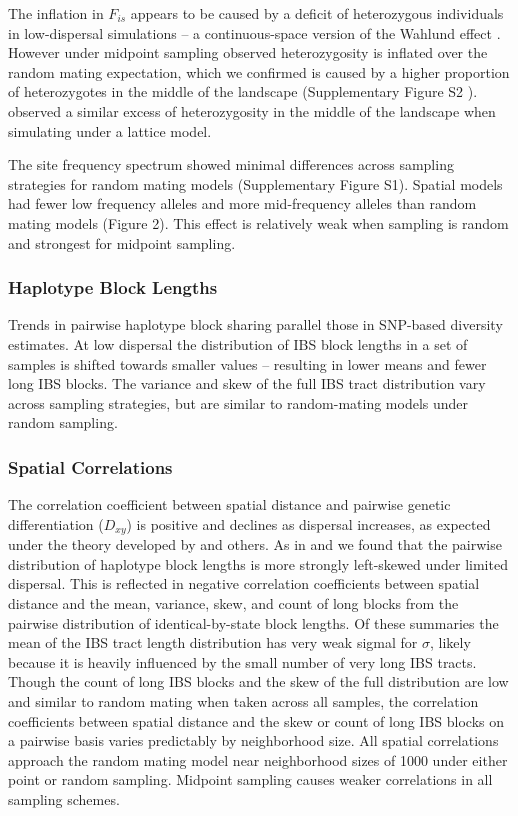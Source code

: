 \documentclass[9pt,twocolumn,twoside,lineno]{gsajnl}
\newif\ifcomments
\newcommand{\cjb}[1]{\ifcomments{{\color{blue} \it (#1)}}\else{}\fi}
\begin{document}
The inflation in $F_{is}$ appears to be caused by a deficit of heterozygous individuals in low-dispersal simulations -- a continuous-space version of the Wahlund effect \citep{Wahlund1928}. However under midpoint sampling observed heterozygosity is inflated over the random mating expectation, which we confirmed is caused by a higher proportion of heterozygotes in the middle of the landscape (Supplementary Figure S2 \cjb{CJ - this fig isn't super convincing -- will try denser sampling}). \cite{Shirk2014} observed a similar excess of heterozygosity in the middle of the landscape when simulating under a lattice model. 

The site frequency spectrum showed minimal differences across sampling strategies for random mating models (Supplementary Figure S1). Spatial models had fewer low frequency alleles and more mid-frequency alleles than random mating models (Figure 2). This effect is relatively weak when sampling is random and strongest for midpoint sampling. 

\subsubsection{Haplotype Block Lengths}
Trends in pairwise haplotype block sharing parallel those in SNP-based diversity estimates. At low dispersal the distribution of IBS block lengths in a set of samples is shifted towards smaller values -- resulting in lower means and fewer long IBS blocks. The variance and skew of the full IBS tract distribution vary across sampling strategies, but are similar to random-mating models under random sampling. 

\subsubsection{Spatial Correlations}
The correlation coefficient between spatial distance and pairwise genetic differentiation ($D_{xy}$) is positive and declines as dispersal increases, as expected under the theory developed by \citep{Rousset1997} and others. As in \citep{Ringbauer2017} and \citep{Baharian2016} we found that the pairwise distribution of haplotype block lengths is more strongly left-skewed under limited dispersal. This is reflected in negative correlation coefficients between spatial distance and the mean, variance, skew, and count of long blocks from the pairwise distribution of identical-by-state block lengths. Of these summaries the mean of the IBS tract length distribution has very weak sigmal for $\sigma$, likely because it is heavily influenced by the small number of very long IBS tracts. Though the count of long IBS blocks and the skew of the full distribution are low and similar to random mating when taken across all samples, the correlation coefficients between spatial distance and the skew or count of long IBS blocks on a pairwise basis varies predictably by neighborhood size. All spatial correlations approach the random mating model near neighborhood sizes of 1000 under either point or random sampling. Midpoint sampling causes weaker correlations in all sampling schemes. 
\end{document}
